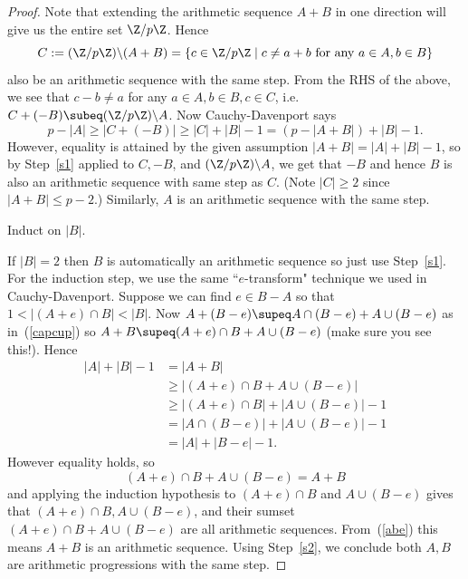 \begin{proof}
Note that extending the arithmetic sequence $A+B$ in one direction will give us the entire set $\Z/p\Z$. Hence 
\[C:=(\Z/p\Z)\backslash (A+B)=\{c\in \Z/p\Z\mid c\neq a+b\text{ for any }a\in A,b\in B \}\]
also be an arithmetic sequence with the same step. 
From the RHS of the above, we see that $c-b\neq a$ for any $a\in A,b\in B,c\in C$, i.e. $C+(-B)\subeq (\Z/p\Z)\backslash A$. Now Cauchy-Davenport says
\[
p-|A|\geq |C+(-B)|\geq |C|+|B|-1=(p-|A+B|)+|B|-1.
\]
However, equality is attained by the given assumption $|A+B|=|A|+|B|-1$, so by Step~\ref{s1} applied to $C, -B$, and $(\Z/p\Z)\backslash A$, we get that $-B$ and hence $B$ is also an arithmetic sequence with same step as $C$. (Note $|C|\geq 2$ since $|A+B|\leq p-2$.) Similarly, $A$ is an arithmetic sequence with the same step.
\begin{st}\label{s3}
Induct on $|B|$.
\end{st}
If $|B|=2$ then $B$ is automatically an arithmetic sequence so just use Step~\ref{s1}. For the induction step, we use the same ``$e$-transform" technique we used in Cauchy-Davenport. Suppose we can find $e\in B-A$ so that $1<|(A+e)\cap B|<|B|$. Now $A+(B-e)\supeq A\cap (B-e)+A\cup (B-e)$ as in~(\ref{capcup}) so $A+B\supeq (A+e)\cap B+A\cup (B-e)$ (make sure you see this!). Hence
\begin{align*}
|A|+|B|-1&=|A+B|\\
&\geq |(A+e)\cap B+A\cup (B-e)|\\
&\geq|(A+e)\cap B|+|A\cup (B-e)|-1\\
&=|A\cap (B-e)|+|A\cup (B-e)|-1\\
&=|A|+|B-e|-1.
\end{align*}
However equality holds, so 
\begin{equation}\label{abe}
(A+e)\cap B+A\cup (B-e)=A+B
\end{equation}
and applying the induction hypothesis to $(A+e)\cap B$ and $A\cup (B-e)$ gives that $(A+e)\cap B,A\cup (B-e)$, and their sumset $(A+e)\cap B+A\cup (B-e)$ are all arithmetic sequences. From~(\ref{abe}) this means $A+B$ is an arithmetic sequence. Using Step~\ref{s2}, we conclude both $A,B$ are arithmetic progressions with the same step.


\end{proof}
